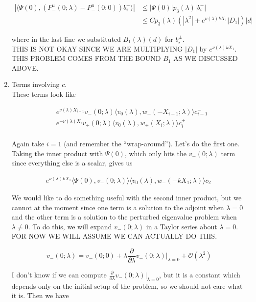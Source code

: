 \documentclass[12pt]{article}
\begin{document}
\begin{enumerate}
\begin{align*}
|\langle \Psi(0), (P^u_-(0; \lambda) - P^u_-(0; 0))b_i^- \rangle|
&\leq |\Psi(0)| p_3(\lambda)|b_i^-| \\
&\leq C p_3(\lambda) (|\lambda^2| + e^{\nu(\lambda)k X_1}|D_1|)|d|
\end{align*}

where in the last line we substituted $B_1(\lambda)(d)$ for $b_i^\pm$.\\

THIS IS NOT OKAY SINCE WE ARE MULTIPLYING $|D_1|$ by $e^{\nu(\lambda)k X_1}$. THIS PROBLEM COMES FROM THE BOUND $B_1$ AS WE DISCUSSED ABOVE.

\item Terms involving $c$.\\

These terms look like

\begin{align*}
&e^{\nu(\lambda)X_{i-1}} v_-(0; \lambda) \langle v_0(\lambda), w_-(-X_{i-1}; \lambda) \rangle c_{i-1}^- \\
&e^{-\nu(\lambda)X_i} v_+(0; \lambda) \langle v_0(\lambda), w_+(X_i; \lambda) \rangle c_i^+ \\
\end{align*}

Again take $i = 1$ (and remember the ``wrap-around''). Let's do the first one. Taking the inner product with $\Psi(0)$, which only hits the $v_-(0; \lambda)$ term since everything else is a scalar, gives us 

\begin{align*}
e^{\nu(\lambda)k X_1} \langle \Psi(0), v_-(0; \lambda) \rangle \langle v_0(\lambda), w_-(-k X_1; \lambda) \rangle c_2^- 
\end{align*}

We would like to do something useful with the second inner product, but we cannot at the moment since one term is a solution to the adjoint when $\lambda = 0$ and the other term is a solution to the perturbed eigenvalue problem when $\lambda \neq 0$. To do this, we will expand $v_-(0; \lambda)$ in a Taylor series about $\lambda = 0$. FOR NOW WE WILL ASSUME WE CAN ACTUALLY DO THIS.

\[
v_-(0; \lambda) = v_-(0; 0) + \lambda \frac{\partial}{\partial \lambda}v_-(0; \lambda)\Big|_{\lambda = 0} + \mathcal{O}(\lambda^2)
\]

I don't know if we can compute $\frac{\partial}{\partial \lambda}v_-(0; \lambda)\Big|_{\lambda = 0}$, but it is a constant which depends only on the initial setup of the problem, so we should not care what it is. Then we have


\end{enumerate}
\end{document}
